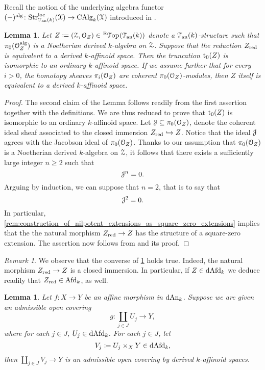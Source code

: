 \documentclass[10pt,a4paper,reqno]{amsart} %
\theoremstyle{plain}
\newtheorem{lem}[thm]{Lemma}
\theoremstyle{definition}
\theoremstyle{remark}
\newtheorem{rem}[thm]{Remark}
\numberwithin{equation}{section}
\begin{document}
Recall the notion of the underlying algebra functor $(-)^\mathrm{alg} \colon \mathrm{Str}^\mathrm{loc}_{\mathcal T_{\mathrm{an}}(k)}(\mathcal X) \to \mathrm{CAlg}_k(\mathcal X)$ introduced in
\cite[Lemma 3.13]{Porta_Yu_Derived_non-archimedean_analytic_spaces}.

\begin{lem} \label{lem:derived_k_analytic_space_whose_reduction_is_affinoid_is_also_affinoid}
    Let $Z \coloneqq (\cZ, \cO_Z) \in \RTop(\cTank)$ denote a $\mathcal T_{\mathrm{an}}(k)$-structure \inftopos such that $\pi_0(\mathcal O_Z^\mathrm{alg}) $ is a Noetherian derived $k$-algebra on $\mathcal Z$.
    Suppose that the reduction
    $Z_{\mathrm{red}}$ is equivalent to a derived $k$-affinoid space. Then the truncation $\mathrm{t}_0(Z)$ is isomorphic to an ordinary $k$-affinoid space.
    If we assume further that for every $i>0$, the homotopy sheaves $\pi_i(\mathcal O_Z)$ are
    coherent $\pi_0(\mathcal O_Z)$-modules, then $Z$ itself is equivalent to a derived $k$-affinoid space.
\end{lem}

\begin{proof} The second claim of the Lemma follows readily from the first assertion together with the definitions.
    We are thus reduced to prove that $\mathrm{t}_0(Z)$ is isomorphic to an ordinary $k$-affinoid space.
    Let $\mathcal J \subseteq \pi_0(\mathcal O_Z)$, denote the coherent ideal sheaf associated to the closed immersion $Z_{\mathrm{red}} \hookrightarrow Z$. Notice that the ideal $\mathcal J$
    agrees with the Jacobson ideal of $\pi_0(\mathcal O_Z)$. Thanks to our assumption that $\pi_0(\mathcal O_Z)$ is a Noetherian derived $k$-algebra on $\mathcal Z$, it follows that there exists
    a sufficiently large integer $n \ge 2$ such that
        \[
            \mathcal J^n = 0.  
        \]
    Arguing by induction, we can suppose that $n = 2$, that is to say that
        \[\mathcal J^2 = 0.\]
    In particular, \cref{rem:construction_of_nilpotent_extensions_as_square_zero_extensions} implies that the
    the natural morphism $Z_{\mathrm{red}} \to Z$ has the structure of a square-zero extension.
    The assertion now follows from \cite[Proposition 6.1]{Porta_Yu_Representability}
    and its proof.
\end{proof}

\begin{rem}
    We observe that the converse of \cref{lem:derived_k_analytic_space_whose_reduction_is_affinoid_is_also_affinoid} holds true.
    Indeed, the natural morphism $Z_{\mathrm{red}} \to Z$ is a closed immersion. In particular, if $Z \in \mathrm{dAfd}_k$ we deduce readily
    that $Z_{\mathrm{red}} \in \mathrm{Afd}_k$, as well.
\end{rem}


\begin{lem} \label{lem:affine_morphisms_are_compatible_with_Zariski_localization_on_the_base}
    Let $f \colon X \to Y$ be an affine morphism in $\mathrm{dAn}_k$. Suppose we are given an admissible open covering
        \[
            g \colon \coprod_{j \in J} U_j \to Y,  
        \]
    where for each $j \in J$, $U_j \in \mathrm{dAfd}_k$. For each $j \in J$, let 
        \[
            V_j \coloneqq U_j \times_X Y \in \mathrm{dAfd}_k,  
        \]
    then $\coprod_{j \in J} V_j \to Y$ is an admissible open covering by derived $k$-affinoid spaces.
\end{lem}
\end{document}
